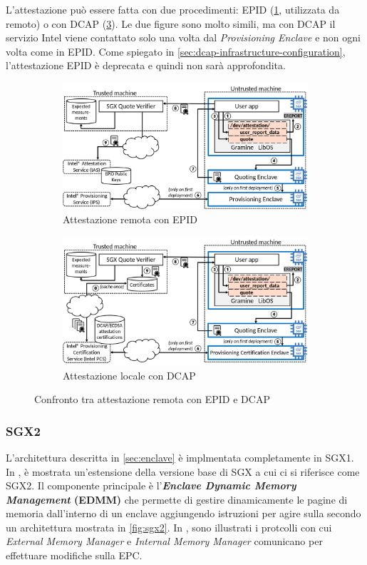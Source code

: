 \documentclass{article}
\begin{document}
L'attestazione può essere fatta con due procedimenti: EPID (\cref{fig:ra-epid}, utilizzata da remoto) o con DCAP (\cref{fig:ra-dcap}). Le due figure sono molto simili, ma con DCAP il servizio Intel viene contattato solo una volta dal \textit{Provisioning Enclave} e non ogni volta come in EPID. Come spiegato in \cref{sec:dcap-infrastructure-configuration}, l'attestazione EPID è deprecata e quindi non sarà approfondita.

\begin{figure}[h]
\centering
\begin{subfigure}{.5\textwidth}
  \centering
  \includegraphics[width=.95\textwidth]{./figures/ch1/ra-sgx-epid.png}
  \caption{Attestazione remota con EPID}\label{fig:ra-epid}
\end{subfigure}%
\begin{subfigure}{.5\textwidth}
  \centering
    \includegraphics[width=.95\textwidth]{./figures/ch1/ra-sgx-dcap.png}
  \caption{Attestazione locale con DCAP}\label{fig:ra-dcap}
\end{subfigure}
\caption{Confronto tra attestazione remota con EPID e DCAP}
\end{figure}

\subsubsection{SGX2}
L'architettura descritta in \cref{sec:enclave} è implmentata completamente in SGX1. In \cite{10.1145/2948618.2954331}, è mostrata un'estensione della versione base di SGX a cui ci si riferisce come SGX2. Il componente principale è l'\textbf{\textit{Enclave Dynamic Memory Management} (EDMM)} che permette di gestire dinamicamente le pagine di memoria dall'interno di un enclave aggiungendo istruzioni per agire sulla secondo un architettura mostrata in \cref{fig:sgx2}. In \cite{10.1145/2948618.2954331}, sono illustrati i protcolli con cui \textit{External Memory Manager} e \textit{Internal Memory Manager} comunicano per effettuare modifiche sulla EPC.
\end{document}
